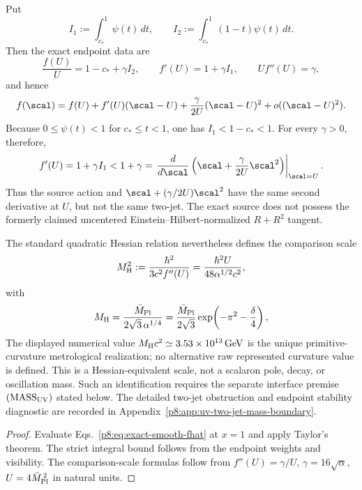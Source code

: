 \documentclass[12pt,a4paper]{article}
\begin{document}
\begin{proposition}
\label{p8:prop:exact-uv-two-jet}
Put
\[
 I_1:=\int_{c_*}^{1}\psi(t)\,dt,
 \qquad
 I_2:=\int_{c_*}^{1}(1-t)\psi(t)\,dt.
\]
Then the exact endpoint data are
\[
 \frac{f(U)}U=1-c_*+\gamma I_2,
 \qquad f'(U)=1+\gamma I_1,
 \qquad Uf''(U)=\gamma,
\]
and hence
\begin{equation}
\label{p8:eq:exact-uv-centered-two-jet}
 f(\scal)
 =f(U)+f'(U)(\scal-U)
  +\frac{\gamma}{2U}(\scal-U)^2
  +o((\scal-U)^2).
\end{equation}
Because \(0\le\psi(t)<1\) for \(c_*\le t<1\), one has
\(I_1<1-c_*<1\).  For every \(\gamma>0\), therefore,
\[
 f'(U)=1+\gamma I_1<1+\gamma
 =\left.\frac{d}{d\scal}
 \left(\scal+\frac{\gamma}{2U}\scal^2\right)\right|_{\scal=U}.
\]
Thus the source action and
\(\scal+(\gamma/2U)\scal^2\) have the same second derivative at \(U\),
but not the same two-jet.  The exact source does not possess the formerly
claimed uncentered Einstein--Hilbert-normalized \(R+R^2\) tangent.

The standard quadratic Hessian relation nevertheless defines the comparison
scale
\begin{equation}
\label{p8:eq:MHess_from_alpha}
 M_{\rm H}^2
 :=\frac{\hbar^2}{3c^2f''(U)}
 =\frac{\hbar^2U}{48\alpha^{1/2}c^2},
\end{equation}
with
\begin{equation}
\label{p8:eq:MHess_Mpl}
 M_{\rm H}
 =\frac{\bar M_{\rm Pl}}{2\sqrt3\,\alpha^{1/4}}
 =\frac{\bar M_{\rm Pl}}{2\sqrt3}
 \exp\!\left(-\pi^2-\frac\delta4\right),
\end{equation}
The displayed numerical value
\(M_{\rm H}c^2\simeq3.53\times10^{13}\,\mathrm{GeV}\) is the unique primitive-curvature metrological realization; no alternative raw represented curvature value is defined.
This is a Hessian-equivalent scale, not a scalaron pole, decay, or oscillation
mass.  Such an identification requires the separate interface premise
\((\mathrm{MASS}_{\rm UV})\) stated below.  The detailed two-jet obstruction
and endpoint stability diagnostic are recorded in
Appendix~\ref{p8:app:uv-two-jet-mass-boundary}.
\end{proposition}

\begin{proof}
Evaluate Eqs.~\eqref{p8:eq:exact-smooth-fhat} at \(x=1\) and apply Taylor's
theorem.  The strict integral bound follows from the endpoint weights and
visibility.  The comparison-scale formulas follow from
\(f''(U)=\gamma/U\), \(\gamma=16\sqrt\alpha\),
\(U=4\bar M_{\rm Pl}^{\,2}\) in natural units.
\end{proof}
\end{document}
